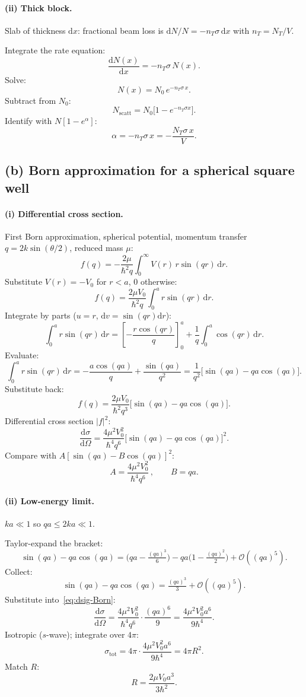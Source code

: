 \documentclass[11pt]{article}
\newcommand{\de}{\mathrm{d}}
\begin{document}
\paragraph{(ii) Thick block.} Slab of thickness $\de x$: fractional beam loss is $\de N/N=-n_T\sigma\,\de x$ with $n_T=N_T/V$.

Integrate the rate equation:
\[
\frac{\de N(x)}{\de x}=-n_T\sigma\, N(x).
\]
Solve:
\[
N(x)=N_0\,e^{-n_T\sigma\,x}.
\]
Subtract from $N_0$:
\[
N_\mathrm{scatt}=N_0\bigl[1-e^{-n_T\sigma x}\bigr].
\]
Identify with $N[1-e^\alpha]$:
\[
\boxed{\;\alpha=-n_T\sigma\,x=-\frac{N_T\sigma\,x}{V}.\;}
\]

\subsection*{(b) Born approximation for a spherical square well}

\paragraph{(i) Differential cross section.} First Born approximation, spherical potential, momentum transfer $q=2k\sin(\theta/2)$, reduced mass $\mu$:
\[
f(q)=-\frac{2\mu}{\hbar^2 q}\int_0^\infty V(r)\,r\sin(qr)\,\de r.
\]
Substitute $V(r)=-V_0$ for $r<a$, $0$ otherwise:
\[
f(q)=\frac{2\mu V_0}{\hbar^2 q}\int_0^a r\sin(qr)\,\de r.
\]
Integrate by parts ($u=r$, $\de v=\sin(qr)\de r$):
\[
\int_0^a r\sin(qr)\,\de r=\left[-\frac{r\cos(qr)}{q}\right]_0^a+\frac{1}{q}\int_0^a\cos(qr)\,\de r.
\]
Evaluate:
\[
\int_0^a r\sin(qr)\,\de r=-\frac{a\cos(qa)}{q}+\frac{\sin(qa)}{q^2}=\frac{1}{q^2}\bigl[\sin(qa)-qa\cos(qa)\bigr].
\]
Substitute back:
\[
f(q)=\frac{2\mu V_0}{\hbar^2 q^3}\bigl[\sin(qa)-qa\cos(qa)\bigr].
\]
Differential cross section $|f|^2$:
\begin{equation}
\frac{\de\sigma}{\de\Omega} = \frac{4\mu^2 V_0^2}{\hbar^4 q^6}\bigl[\sin(qa)-qa\cos(qa)\bigr]^2.
\label{eq:dsig-Born}
\end{equation}
Compare with $A[\sin(qa)-B\cos(qa)]^2$:
\[
\boxed{\;A=\frac{4\mu^2 V_0^2}{\hbar^4 q^6}\,, \qquad B = qa.\;}
\]

\paragraph{(ii) Low-energy limit.} $ka\ll 1$ so $qa\le 2ka\ll 1$.

Taylor-expand the bracket:
\[
\sin(qa)-qa\cos(qa)=\bigl(qa-\tfrac{(qa)^3}{6}\bigr)-qa\bigl(1-\tfrac{(qa)^2}{2}\bigr)+\mathcal O((qa)^5).
\]
Collect:
\[
\sin(qa)-qa\cos(qa)=\tfrac{(qa)^3}{3}+\mathcal O((qa)^5).
\]
Substitute into~\eqref{eq:dsig-Born}:
\[
\frac{\de\sigma}{\de\Omega}=\frac{4\mu^2 V_0^2}{\hbar^4 q^6}\cdot\frac{(qa)^6}{9}=\frac{4\mu^2 V_0^2 a^6}{9\hbar^4}.
\]
Isotropic ($s$-wave); integrate over $4\pi$:
\[
\sigma_\mathrm{tot}=4\pi\cdot\frac{4\mu^2 V_0^2 a^6}{9\hbar^4}=4\pi R^2.
\]
Match $R$:
\[
\boxed{\;R=\frac{2\mu V_0 a^3}{3\hbar^2}.\;}
\]
\end{document}
